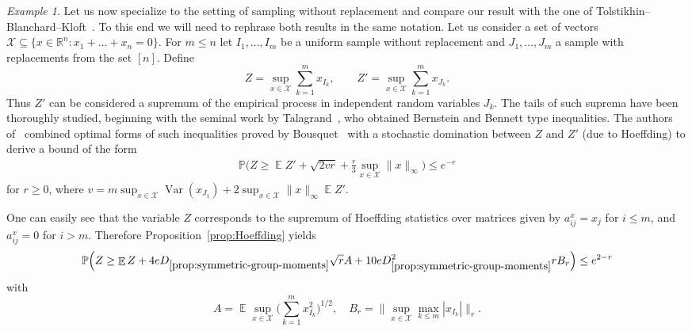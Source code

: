 \documentclass[a4paper]{amsart}
\theoremstyle{definition}
\theoremstyle{remark}
\newtheorem{example}[theorem]{Example}
\numberwithin{equation}{section}
\newcommand*{\RR}{\mathbb{R}}
\newcommand*{\ds}{D_{\ref{prop:symmetric-group-moments}}}
\DeclareMathOperator{\EE}{\mathbb{E}} %
\newcommand*{\PP}{\mathbb{P}} %
\DeclareMathOperator{\Var}{Var}	%
\begin{document}
\begin{example}
Let us now specialize to the setting of sampling without replacement and compare our result with the one of Tolstikhin--Blanchard--Kloft~\cite{MR3480745}. To this end we will need to rephrase both results in the same notation. Let us consider a set of vectors $\mathcal{X} \subseteq \{x\in \RR^n\colon x_1+\ldots+x_n = 0\}$. For $m \le n$ let $I_1,\ldots,I_m$ be a uniform sample without replacement and $J_1,\ldots,J_m$ a sample with replacements from the set $[n]$. Define
\begin{displaymath}
  Z = \sup_{x\in \mathcal{X}} \sum_{k=1}^m x_{I_k},\qquad Z' = \sup_{x\in \mathcal{X}} \sum_{k=1}^m x_{J_k}.
\end{displaymath}
Thus $Z'$ can be considered a supremum of the empirical process in independent random variables $J_k$. The tails of such suprema have been thoroughly studied, beginning with the seminal work by Talagrand~\cite{MR1419006}, who obtained Bernstein and Bennett type inequalities. The authors of~\cite{MR3480745} combined optimal forms of such inequalities proved by Bousquet~\cite{MR1890640} with a stochastic domination between  $Z$ and $Z'$ (due to Hoeffding) to derive a bound of the form
\begin{align}\label{eq:T-B-K}
  \PP\Big(Z \ge \EE Z' + \sqrt{2v r} + \frac{r}{3}\sup_{x\in \mathcal{X}} \|x\|_\infty\Big) \le e^{-r}
\end{align}
for $r \ge 0$, where $v = m\sup_{x\in \mathcal{X}}\Var(x_{J_1}) + 2\sup_{x\in \mathcal{X}}\|x\|_\infty \EE Z'$.

One can easily see that the variable $Z$ corresponds to the supremum of Hoeffding statistics over matrices given by $a^x_{ij} = x_j$ for $i \le m$, and $a^x_{ij} = 0$ for $i > m$. Therefore Proposition~\ref{prop:Hoeffding} yields
\begin{align}\label{eq:T-B-K-improved}
  \PP\Big(Z \ge \EE Z  + 4e\ds\sqrt{r}A + 10e\ds^2 rB_r \Big) \le e^{2-r}
\end{align}
with
\begin{displaymath}
  A = \EE \sup_{x \in \mathcal{X}} \Big(\sum_{k=1}^m x_{I_k}^2\Big)^{1/2}, \quad B_r = \Big\|\sup_{x\in\mathcal{X}} \max_{k\le m}|x_{I_k}|\Big\|_r.
\end{displaymath}


\end{example}
\end{document}
